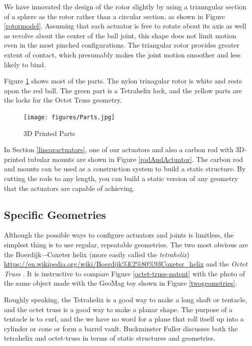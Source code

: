 \documentclass[11pt]{article}
\begin{document}
 We have innovated the design of the rotor slightly by using a trianngular section of a sphere as the
 rotor rather than a circular section, as shown in Figure \ref{rotormodel}.
 Assuming that each actuator is free to rotate about its axis as well as revolve about the
 center of the ball joint, this shape does not limit motion even in the most pinched
 configurations. The triangular rotor provides greater extent of contact,
 which presumably makes the joint motion
 smoother and less likely to bind.
 

 Figure \ref{parts} shows most of the parts. The nylon trinagular rotor is white and rests upon
 the red ball. The green part is a Tetrahelix lock, and the yellow parts are the locks for the Octet Truss
 geometry.

\begin{figure}[H]
  \centering
    \texttt{[image: figures/Parts.jpg]}
    \caption[3D Printed Parts]{3D Printed Parts}
      \label{parts}
\end{figure}

In Section \ref{linearactuators}, one of our actuators and also a carbon rod with 3D-printed tubular mounts
are shown in Figure \ref{rodAndActuator}.
The carbon rod and mounts can be used as a construction system to build a static structure.
By cutting the rods to any length, you can build a static version of any geometry that the actuators
are capable of achieving.

\subsection{Specific Geometries}

Although the possible ways to configure actuators and joints is limitless, the simplest thing is to
use regular, repeatable geometries. The two most obvious are the Boerdijk–-Coxeter helix
(more easily called the \textit{tetrahelix})
\url{https://en.wikipedia.org/wiki/Boerdijk%E2%80%93Coxeter_helix}
  and the \emph{Octet Truss}
  \cite{richard1961synergetic}.
  It is instructive to compare Figure \ref{octet-truss-patent} with the photo of the same object
  made with the GeoMag toy shown in Figure \ref{twogeometries}.
    
Roughly speaking, the Tetrahelix is a good way to make a long shaft or tentacle, and the octet truss
is a good way to make a planar shape. The purpose of a tentacle is to curl, and the we have no word for
a plane that roll itself up into a cylinder or cone or form a barrel vault. Buckminster Fuller discusses
both the tetrahelix and octet-truss \cite{fuller1982synergetics} in terms of static structures and geometries.
\end{document}
